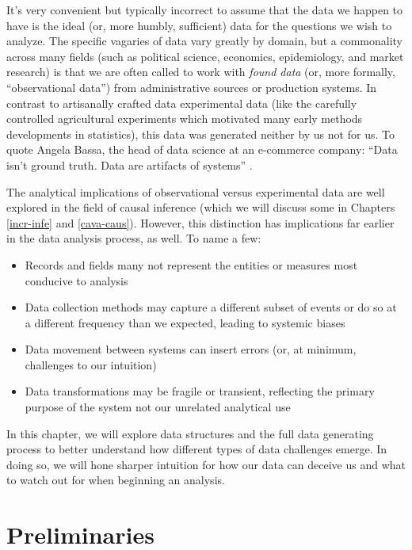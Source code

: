 \documentclass[
]{krantz}
\providecommand{\tightlist}{%
  \setlength{\itemsep}{0pt}\setlength{\parskip}{0pt}}
\begin{document}
It's very convenient but typically incorrect to assume that the data we happen to have is the ideal (or, more humbly, sufficient) data for the questions we wish to analyze.
The specific vagaries of data vary greatly by domain, but a commonality across many fields (such as political science, economics, epidemiology, and market research) is that we are often called to work with \emph{found data} (or, more formally, ``observational data'') from administrative sources or production systems.
In contrast to artisanally crafted data experimental data (like the carefully controlled agricultural experiments which motivated many early methods developments in statistics), this data was generated neither by us not for us.
To quote Angela Bassa, the head of data science at an e-commerce company: ``Data isn't ground truth. Data are artifacts of systems'' \citep{bassa_2017}.

The analytical implications of observational versus experimental data are well explored in the field of causal inference (which we will discuss some in Chapters \ref{incr-infe} and \ref{cava-caus}).
However, this distinction has implications far earlier in the data analysis process, as well.
To name a few:

\begin{itemize}
\tightlist
\item
  Records and fields many not represent the entities or measures most conducive to analysis
\item
  Data collection methods may capture a different subset of events or do so at a different frequency than we expected, leading to systemic biases
\item
  Data movement between systems can insert errors (or, at minimum, challenges to our intuition)
\item
  Data transformations may be fragile or transient, reflecting the primary purpose of the system not our unrelated analytical use
\end{itemize}

In this chapter, we will explore data structures and the full data generating process to better understand how different types of data challenges emerge.
In doing so, we will hone sharper intuition for how our data can deceive us and what to watch out for when beginning an analysis.

\hypertarget{preliminaries}{%
\section{Preliminaries}\label{preliminaries}}
\end{document}
